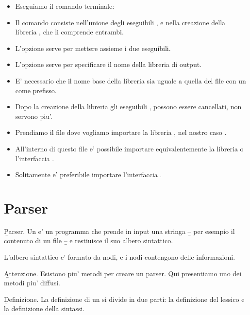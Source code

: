 \begin{itemize}
\item[\bbox] Eseguiamo il comando terminale:\par
{}
\item[] Il comando consiste nell'unione degli eseguibili ,  e nella creazione della libreria , che li comprende entrambi.
\item[] L'opzione  serve per mettere assieme i due eseguibili.
\item[] L'opzione  serve per specificare il nome della libreria di output.
\item[] E' necessario che il nome base della libreria sia uguale a quella del file  con un  \tw{\_} come prefisso.
\item[] Dopo la creazione della libreria  gli eseguibili ,  possono essere cancellati, non servono piu'.
\item[\bbox] Prendiamo il file  dove vogliamo importare la libreria , nel nostro caso .
\item[] All'interno di questo file e' possibile importare equivalentemente la libreria   o l'interfaccia  .
\item[] Solitamente e' preferibile importare l'interfaccia  .
\end{itemize}

\section{Parser}

\b{Parser}. Un  e' un programma che prende in input una stringa \b{--} per esempio il contenuto di un file \b{--} e restiuisce il suo albero sintattico.\par
L'albero sintattico e' formato da nodi, e i nodi contengono delle informazioni.

\skipline

\b{Attenzione}. Esistono piu' metodi per creare un parser. Qui presentiamo uno dei metodi piu' diffusi.

\skipline

\b{Definizione}. La definizione di un  si divide in due parti: la definizione del lessico e la definizione della sintassi.

\skipline

